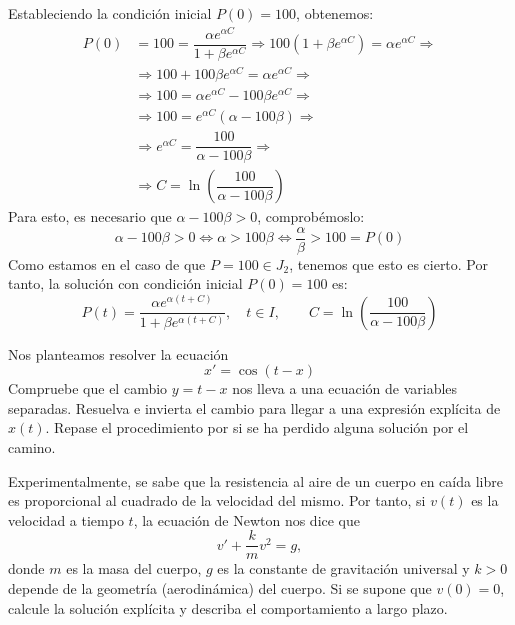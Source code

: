 \begin{ejercicio}
\begin{itemize}
        Estableciendo la condición inicial $P(0)=100$, obtenemos:
        \begin{align*}
            P(0) &= 100 = \dfrac{\alpha e^{\alpha C}}{1+\beta e^{\alpha C}} \Longrightarrow 100(1+\beta e^{\alpha C}) = \alpha e^{\alpha C} \Longrightarrow \\ &\Longrightarrow 100 + 100\beta e^{\alpha C} = \alpha e^{\alpha C} \Longrightarrow \\ &\Longrightarrow 100 = \alpha e^{\alpha C} - 100\beta e^{\alpha C} \Longrightarrow \\ &\Longrightarrow 100 = e^{\alpha C}(\alpha - 100\beta) \Longrightarrow \\ &\Longrightarrow e^{\alpha C} = \dfrac{100}{\alpha - 100\beta} \Longrightarrow \\ &\Longrightarrow C = \ln\left(\dfrac{100}{\alpha - 100\beta}\right)
        \end{align*}
        Para esto, es necesario que $\alpha - 100\beta > 0$, comprobémoslo:
        \begin{equation*}
            \alpha - 100\beta > 0 \Longleftrightarrow \alpha > 100\beta \Longleftrightarrow \dfrac{\alpha}{\beta} > 100=P(0)
        \end{equation*}
        Como estamos en el caso de que $P=100\in J_2$, tenemos que esto es cierto. Por tanto, la solución con condición inicial $P(0)=100$ es:
        \begin{equation*}
            P(t) = \dfrac{\alpha e^{\alpha (t + C)}}{1+\beta e^{\alpha (t + C)}}, \quad t\in I, \qquad C=\ln\left(\dfrac{100}{\alpha - 100\beta}\right)
        \end{equation*}
    \end{itemize}

\end{ejercicio}

\begin{ejercicio}
    Nos planteamos resolver la ecuación
    \begin{equation*}
        x' = \cos(t - x)
    \end{equation*}
    Compruebe que el cambio $y = t - x$ nos lleva a una ecuación de variables separadas. Resuelva e invierta el cambio para llegar a una expresión explícita de $x(t)$. Repase el procedimiento por si se ha perdido alguna solución por el camino.
\end{ejercicio}

\begin{ejercicio}
    Experimentalmente, se sabe que la resistencia al aire de un cuerpo en caída libre es proporcional al cuadrado de la velocidad del mismo. Por tanto, si $v(t)$ es la velocidad a tiempo $t$, la ecuación de Newton nos dice que
    \begin{equation*}
        v' + \dfrac{k}{m}v^2 = g,
    \end{equation*}
    donde $m$ es la masa del cuerpo, $g$ es la constante de gravitación universal y $k > 0$ depende de la geometría (aerodinámica) del cuerpo. Si se supone que $v(0) = 0$, calcule la solución explícita y describa el comportamiento a largo plazo.
\end{ejercicio}

